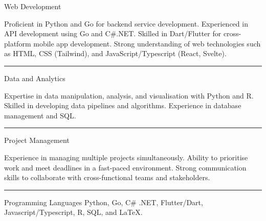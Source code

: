 \begin{cvskills}
  \cvskill
    {Web Development} %
    {
    Proficient in Python and Go for backend service development.\newline
    Experienced in API development using Go and C\#.NET.\newline
    Skilled in Dart/Flutter for cross-platform mobile app development.\newline
    Strong understanding of web technologies such as HTML, CSS (Tailwind), \newline
    and JavaScript/Typescript (React, Svelte).
  \rule{11.5cm}{0.4pt}
    }

    \cvskill
    {Data and Analytics}
    {
        Expertise in data manipulation, analysis, and visualisation with Python and R.\newline
        Skilled in developing data pipelines and algorithms.\newline
        Experience in database management and SQL.
  \rule{11.5cm}{0.4pt}
    }
    \cvskill
    {Project Management}
    {
        Experience in managing multiple projects simultaneously.\newline
        Ability to prioritise work and meet deadlines in a fast-paced environment.\newline
        Strong communication skills to collaborate with cross-functional teams and stakeholders.
  \rule{11.5cm}{0.1pt}
    }
    \cvskill
    {Programming Languages}
    {
        Python, Go, C\# .NET, Flutter/Dart, Javascript/Typescript, R, SQL, and LaTeX.
    }
\end{cvskills}


